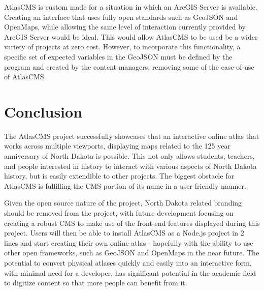 \documentclass[11pt, final, conference, twocolumn]{IEEEtran}
\begin{document}
AtlasCMS is custom made for a situation in which an ArcGIS Server is available. Creating an interface that uses fully open standards such as GeoJSON and OpenMaps, while allowing the same level of interaction currently provided by ArcGIS Server would be ideal. This would allow AtlasCMS to be used be a wider variety of projects at zero cost. However, to incorporate this functionality, a specific set of expected variables in the GeoJSON must be defined by the program and created by the content managers, removing some of the ease-of-use of AtlasCMS.

\section{Conclusion}
The AtlasCMS project successfully showcases that an interactive online atlas that works across multiple viewports, displaying maps related to the 125 year anniversary of North Dakota is possible. This not only allows students, teachers, and people interested in history to interact with various aspects of North Dakota history, but is easily extendible to other projects. The biggest obstacle for AtlasCMS is fulfilling the CMS portion of its name in a user-friendly manner.

Given the open source nature of the project, North Dakota related branding should be removed from the project, with future development focusing on creating a robust CMS to make use of the front-end features displayed during this project. Users will then be able to install AtlasCMS as a Node.js project in 2 lines and start creating their own online atlas - hopefully with the ability to use other open frameworks, such as GeoJSON and OpenMaps in the near future. The potential to convert physical atlases quickly and easily into an interactive form, with minimal need for a developer, has significant potential in the academic field to digitize content so that more people can benefit from it.



\end{document}

